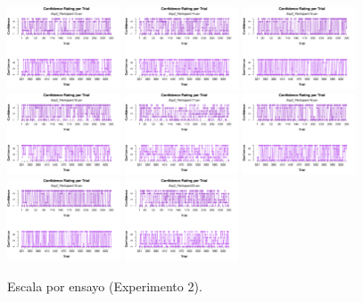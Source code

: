 \begin{figure}[th]
\includegraphics[width=0.30\textwidth]{Figures/Rating_Exp2_P13} \includegraphics[width=0.30\textwidth]{Figures/Rating_Exp2_P14} \includegraphics[width=0.30\textwidth]{Figures/Rating_Exp2_P15}
\includegraphics[width=0.30\textwidth]{Figures/Rating_Exp2_P16} \includegraphics[width=0.30\textwidth]{Figures/Rating_Exp2_P17} \includegraphics[width=0.30\textwidth]{Figures/Rating_Exp2_P18}
\includegraphics[width=0.30\textwidth]{Figures/Rating_Exp2_P19} \includegraphics[width=0.30\textwidth]{Figures/Rating_Exp2_P20} 
\caption[Rating_Exp2]{Escala por ensayo (Experimento 2).}
\label{fig:Rating_E2}
\end{figure}




